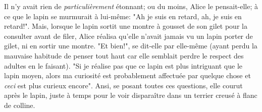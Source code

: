 Il n'y avait rien de \emph{particulièrement} étonnant; ou du moins, Alice le pensait-elle; à ce que le lapin se murmurait à lui-même: "Ah je suis en retard, ah, je suis en retard!". Mais, lorsque le lapin sortit une montre à gousset de son gilet pour la consulter avant de filer, Alice réalisa qu'elle n'avait jamais vu un lapin porter de gilet, ni en sortir une montre. "Et bien!", se dit-elle par elle-même (ayant perdu la mauvaise habitude de penser tout haut car elle semblait perdre le respect des adultes en le faisant). "Si je réalise pas que ce lapin est plus intriguant que le lapin moyen, alors ma curiosité est probablement affectuée par quelque chose et \emph{ceci} est plus curieux encore". Ansi, se posant toutes ces questions, elle courut après le lapin, juste à temps pour le voir disparaître dans un terrier creusé à flanc de colline.

\pagebreak[2]

